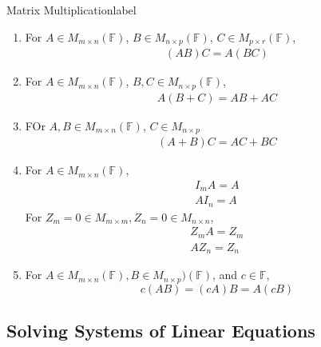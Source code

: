 \documentclass[12pt]{article}
\theoremstyle{definition}
\newcommand{\F}{\ensuremath{\mathbb{F}}}
\begin{document}
\begin{properties}{Matrix Multiplication}{label}
    \begin{enumerate}
        \item 
        For $A \in M_{m \times n}(\F)$, $B \in M_{n\times p}(\F)$, $C \in M_{p \times r}(\F)$,
        \begin{align*}
            (AB)C = A(BC) \tag{Associative}
        \end{align*}
        \item 
        For $A \in M_{m \times n}(\F)$, $B,C\in M_{n\times p}(\F)$,
        \begin{align*}
            A(B + C) = AB + AC \tag{Left distributivity}
        \end{align*}
        \item FOr $A,B \in M_{m\times n}(\F)$, $C\in M_{n\times p}$
        \begin{align*}
            (A + B)C = AC + BC \tag{Right distributivity}
        \end{align*}
        \item For $A\in M_{m\times n}(\F)$, 
        \begin{align*}
            I_mA = A\\
            AI_n = A
        \end{align*}
        For $Z_m = 0 \in M_{m\times m}, Z_n = 0\in M_{n\times n}$,
        \begin{align*}
            Z_mA = Z_m\\
            AZ_n = Z_n
        \end{align*}
        \item For $A\in M_{m\times n}(\F), B \in M_{n\times p})(\F)$, and $c\in \F$,
        $$c(AB) = (cA)B = A(cB)$$

    \end{enumerate}
\end{properties}

\subsection{Solving Systems of Linear Equations}
\end{document}
